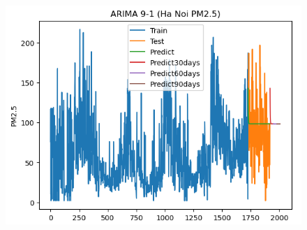 \begin{figure}[H]
    \hfill
    \begin{minipage}{0.15\textwidth}
    \centering
    \includegraphics[width=1\textwidth]{img/final/ARIMA/90D/ARIMA_9_1_HN.png}
    \end{minipage}
    \hfill


\end{figure}
